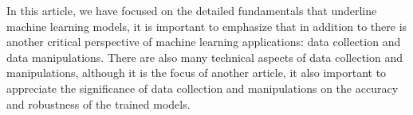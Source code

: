 
\par
In this article, we have focused on the detailed fundamentals that underline machine learning models, it is important to emphasize that in addition to there is another critical perspective of machine learning applications: data collection and data manipulations. There are also many technical aspects of data collection and manipulations, although it is the focus of another article, it also important to appreciate the significance of data collection and manipulations on the accuracy and robustness of the trained models.
\par 
